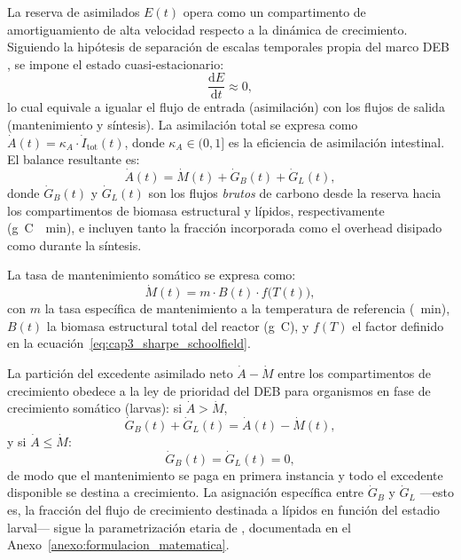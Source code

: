 La reserva de asimilados $E(t)$ opera como un compartimento de amortiguamiento de alta velocidad respecto a la dinámica de crecimiento. Siguiendo la hipótesis de separación de escalas temporales propia del marco DEB \parencite{eriksenDynamicModellingFeed2022}, se impone el estado cuasi-estacionario:
\begin{equation}
    \frac{\mathrm{d}E}{\mathrm{d}t} \approx 0,
    \label{eq:cap3_qss_reserva}
\end{equation}
lo cual equivale a igualar el flujo de entrada (asimilación) con los flujos de salida (mantenimiento y síntesis). La asimilación total se expresa como $\dot{A}(t) = \kappa_A \cdot \dot{I}_{\mathrm{tot}}(t)$, donde $\kappa_A \in (0,1]$ es la eficiencia de asimilación intestinal. El balance resultante es:
\begin{equation}
    \dot{A}(t) = \dot{M}(t) + \dot{G}_B(t) + \dot{G}_L(t),
    \label{eq:cap3_balance_asimilados}
\end{equation}
donde $\dot{G}_B(t)$ y $\dot{G}_L(t)$ son los flujos \emph{brutos} de carbono desde la reserva hacia los compartimentos de biomasa estructural y lípidos, respectivamente (\si{\gram C \per \minute}), e incluyen tanto la fracción incorporada como el overhead disipado como  durante la síntesis.

La tasa de mantenimiento somático se expresa como:
\begin{equation}
    \dot{M}(t) = m \cdot B(t) \cdot f\bigl(T(t)\bigr),
    \label{eq:cap3_mantenimiento}
\end{equation}
con $m$ la tasa específica de mantenimiento a la temperatura de referencia (\si{\per\minute}), $B(t)$ la biomasa estructural total del reactor (\si{\gram C}), y $f(T)$ el factor definido en la ecuación~\eqref{eq:cap3_sharpe_schoolfield}.

La partición del excedente asimilado neto $\dot{A} - \dot{M}$ entre los compartimentos de crecimiento obedece a la ley de prioridad del DEB para organismos en fase de crecimiento somático (larvas): si $\dot{A} > \dot{M}$,
\begin{equation}
    \dot{G}_B(t) + \dot{G}_L(t) = \dot{A}(t) - \dot{M}(t),
    \label{eq:cap3_prioridad_crecimiento}
\end{equation}
y si $\dot{A} \leq \dot{M}$:
\begin{equation}
    \dot{G}_B(t) = \dot{G}_L(t) = 0,
    \label{eq:cap3_prioridad_mantenimiento}
\end{equation}
de modo que el mantenimiento se paga en primera instancia y todo el excedente disponible se destina a crecimiento. La asignación específica entre $\dot{G}_B$ y $\dot{G}_L$ ---esto es, la fracción del flujo de crecimiento destinada a lípidos en función del estadio larval--- sigue la parametrización etaria de \textcite{eriksenDynamicModellingFeed2022}, documentada en el Anexo~\ref{anexo:formulacion_matematica}.

